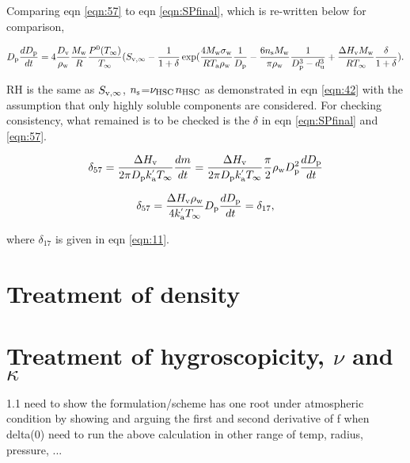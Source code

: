 \documentclass[12pt]{article}
\begin{document}
Comparing eqn \ref{eqn:57} to eqn \ref{eqn:SPfinal}, which is re-written below for comparison,

\begin{equation}\label{eqn:58}
D_{\rm p}\frac{dD_{\rm p}}{dt}=4 \frac{D_{\rm v}} {\rho_{\rm w}} \frac{M_{\rm w}}{R} \frac{P^{\rm 0}(T_{\infty})} {T_{\infty}} (S_{\rm v, \infty} - \frac{1}{1+\delta} \exp(\frac{4 M_{\rm w}\sigma_{\rm w}}{R T_{\rm a} \rho_{\rm w}}\frac{1}{D_{\rm p}}-\frac{6 n_{\rm s} M_{\rm w}}{\pi \rho_{\rm w}} \frac{1}{D_{\rm p}^{3}-d_{\rm u}^{3}}+\frac{\Delta H_{\rm v} M_{\rm w}}{R T_{\infty}} \frac{\delta}{1+\delta}). \nonumber
\end{equation} 

RH is the same as $S_{\rm v, \infty}$, $n_{\rm s}$=$\nu_{\rm HSC}$$n_{\rm HSC}$ as demonstrated in eqn \ref{eqn:42} with the assumption that only highly soluble components are considered. For checking consistency, what remained is to be checked is the $\delta$ in eqn \ref{eqn:SPfinal} and \ref{eqn:57}. 


\begin{equation}\label{eqn:59}
\delta_{57}=\frac{\Delta H_{\rm v}}{2 \pi D_{\rm p} k^{'}_{\rm a} T_{\infty}} \frac{dm}{dt}
=\frac{\Delta H_{\rm v}}{2 \pi D_{\rm p} k^{'}_{\rm a} T_{\infty}} \frac{\pi}{2}\rho_{\rm w}D_{\rm p}^{2}\frac{dD_{\rm p}}{dt}
\end{equation}


\begin{equation}\label{eqn:60}
\delta_{57}=\frac{\Delta H_{\rm v} \rho_{\rm w}}{4 k^{'}_{\rm a} T_{\infty}} D_{\rm p}\frac{dD_{\rm p}}{dt}=\delta_{17},
\end{equation}

where $\delta_{17}$ is given in eqn \ref{eqn:11}.

\section{Treatment of density}

\section{Treatment of hygroscopicity, $\nu$ and $\kappa$}


1.1 need to show the formulation/scheme has one root under atmospheric condition
by showing and arguing the first and second derivative of f when delta(0)
need to run the above calculation in other range of temp, radius, pressure, ...
\end{document}
